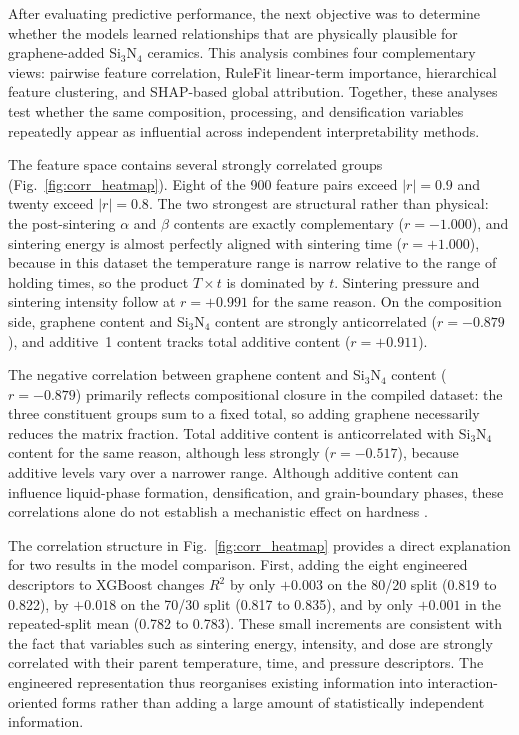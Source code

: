 \documentclass[pdflatex,sn-mathphys-num]{sn-jnl}%
\newif\ifrevmarks%
\newcommand{\revmark}[1]{\ifrevmarks\textcolor{revblue}{#1}\else#1\fi}%
\theoremstyle{thmstyleone}%
\theoremstyle{thmstyletwo}%
\theoremstyle{thmstylethree}%
\begin{document}
After evaluating predictive performance, the next objective was to determine whether the models learned relationships that are physically plausible for graphene-added Si$_3$N$_4$ ceramics. This analysis combines four complementary views: pairwise feature correlation, RuleFit linear-term importance, hierarchical feature clustering, and SHAP-based global attribution. Together, these analyses test whether the same composition, processing, and densification variables repeatedly appear as influential across independent interpretability methods.


\revmark{The feature space contains several strongly correlated groups (Fig.~\ref{fig:corr_heatmap}). Eight of the 900 feature pairs exceed $|r|=0.9$ and twenty exceed $|r|=0.8$. The two strongest are structural rather than physical: the post-sintering $\alpha$ and $\beta$ contents are exactly complementary ($r=-1.000$), and sintering energy is almost perfectly aligned with sintering time ($r=+1.000$), because in this dataset the temperature range is narrow relative to the range of holding times, so the product $T\times t$ is dominated by $t$. Sintering pressure and sintering intensity follow at $r=+0.991$ for the same reason. On the composition side, graphene content and Si$_3$N$_4$ content are strongly anticorrelated ($r=-0.879$), and additive~1 content tracks total additive content ($r=+0.911$).}

\revmark{The negative correlation between graphene content and Si$_3$N$_4$ content ($r=-0.879$) primarily reflects compositional closure in the compiled dataset: the three constituent groups sum to a fixed total, so adding graphene necessarily reduces the matrix fraction. Total additive content is anticorrelated with Si$_3$N$_4$ content for the same reason, although less strongly ($r=-0.517$), because additive levels vary over a narrower range. Although additive content can influence liquid-phase formation, densification, and grain-boundary phases, these correlations alone do not establish a mechanistic effect on hardness \cite{german2009liquid}.}

\revmark{The correlation structure in Fig.~\ref{fig:corr_heatmap} provides a direct explanation for two results in the model comparison. First, adding the eight engineered descriptors to XGBoost changes $R^2$ by only $+0.003$ on the 80/20 split (0.819 to 0.822), by $+0.018$ on the 70/30 split (0.817 to 0.835), and by only $+0.001$ in the repeated-split mean (0.782 to 0.783). These small increments are consistent with the fact that variables such as sintering energy, intensity, and dose are strongly correlated with their parent temperature, time, and pressure descriptors. The engineered representation thus reorganises existing information into interaction-oriented forms rather than adding a large amount of statistically independent information.}
\end{document}
